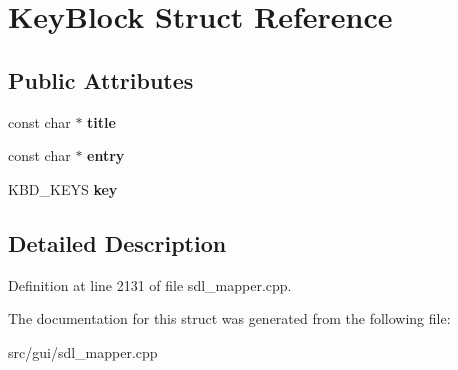 \hypertarget{structKeyBlock}{\section{Key\-Block Struct Reference}
\label{structKeyBlock}
}
\subsection*{Public Attributes}
\begin{DoxyCompactItemize}
\item 
\hypertarget{structKeyBlock_aa8f0583008d486e791f4712f7206c256}{const char $\ast$ {\bfseries title}}\label{structKeyBlock_aa8f0583008d486e791f4712f7206c256}

\item 
\hypertarget{structKeyBlock_a025404788705e95fb7d9484ee068dd50}{const char $\ast$ {\bfseries entry}}\label{structKeyBlock_a025404788705e95fb7d9484ee068dd50}

\item 
\hypertarget{structKeyBlock_ad7f402307cea47b73666058183ded837}{K\-B\-D\-\_\-\-K\-E\-Y\-S {\bfseries key}}\label{structKeyBlock_ad7f402307cea47b73666058183ded837}

\end{DoxyCompactItemize}


\subsection{Detailed Description}


Definition at line 2131 of file sdl\-\_\-mapper.\-cpp.



The documentation for this struct was generated from the following file\-:\begin{DoxyCompactItemize}
\item 
src/gui/sdl\-\_\-mapper.\-cpp\end{DoxyCompactItemize}

